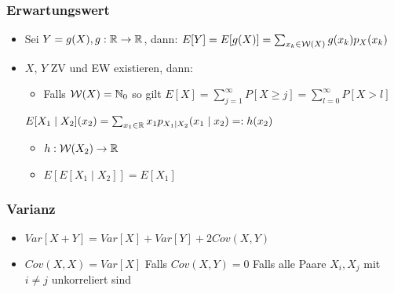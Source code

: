 \subsubsection{Erwartungswert}
\begin{itemize}
     $E[X] := \sum_{x_k \in \mc{W}(X)} x_k p_X(x_k)$
        \begin{itemize}
            \item Definiert falls $\sum_{x_k \in \mc{W}(X)} |x_k| p_X(x_k) < \infty$
        \end{itemize}
    \item Sei $Y = g(X), g: \mathbb{R} \to \mathbb{R}$, dann: $E[Y] = E[g(X)] = \sum_{x_k \in \mathcal{W}(X)} g(x_k) p_X(x_k)$
    \item $X$, $Y$ ZV und EW existieren, dann:
        \begin{itemize}
             $\forall \omega \ X(\omega) \le Y(\omega) \implies E[X] \le E[Y]$
             Für bel. $a,b \in \R$ gilt $E[aX + b] = a E[X] + b$
            \item Falls $\mathcal{W}(X) = \mathbb{N}_0$ so gilt $E[X] = \sum_{j=1}^{\infty} P[X \ge j] = \sum_{l=0}^{\infty} P[X > l]$
        \end{itemize}
         $E[X_1 \mid X_2](x_2) = \sum_{x_1 \in \mathbb{R}} x_1 p_{X_1 \mid X_2} (x_1 \mid x_2) =: h(x_2)$
            \begin{itemize}
                \item $h : \mathcal{W}(X_2) \to \mathbb{R}$
                \item $E[E[X_1 \mid X_2]] = E[X_1]$
            \end{itemize}
\end{itemize}

\subsubsection{Varianz}
\begin{itemize}
     $Var[X] := E[(X - E[X])^2]$
        \begin{itemize}
            \item Definiert falls $E[X^2] < \infty$
            \item $Var[X] = \sum_{x_k \in \mc{W}(X)} (x_k - E[X])^2 p_X(x_k)$
            \item Alternative definition $Var[X] = E[X^2] - (E[X])^2$
            \item $Var[aX + b] = a^2 Var[X]$
        \end{itemize}
     $\sigma(X) := \sqrt{Var[X]}$
     $Cov(X,Y) := E[XY] - E[X] E[Y] = E[(X - E[X])(Y - E[Y])]$
    \item $Var[X + Y] = Var[X] + Var[Y] + 2 Cov(X, Y)$
    \item $Cov(X, X) = Var[X]$
     Falls $Cov(X, Y) = 0$
     Falls alle Paare $X_i, X_j$ mit $i \neq j$ unkorreliert sind
\end{itemize}

